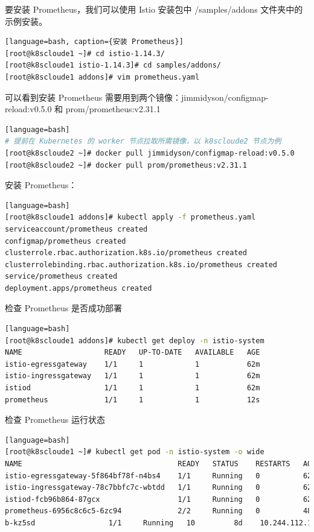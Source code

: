 要安装 Prometheus，我们可以使用 Istio 安装包中 /samples/addons 文件夹中的示例安装。
\begin{lstlisting}[language=bash][language=bash, caption={安装 Prometheus}]
[root@k8scloude1 ~]# cd istio-1.14.3/
[root@k8scloude1 istio-1.14.3]# cd samples/addons/
[root@k8scloude1 addons]# vim prometheus.yaml
\end{lstlisting}
可以看到安装 Prometheus 需要用到两个镜像：jimmidyson/configmap-reload:v0.5.0 和 prom/prometheus:v2.31.1
\begin{lstlisting}[language=bash][language=bash]
# 提前在 Kubernetes 的 worker 节点拉取所需镜像，以 k8scloude2 节点为例
[root@k8scloude2 ~]# docker pull jimmidyson/configmap-reload:v0.5.0
[root@k8scloude2 ~]# docker pull prom/prometheus:v2.31.1
\end{lstlisting}
安装 Prometheus：
\begin{lstlisting}[language=bash][language=bash]
[root@k8scloude1 addons]# kubectl apply -f prometheus.yaml
serviceaccount/prometheus created
configmap/prometheus created
clusterrole.rbac.authorization.k8s.io/prometheus created
clusterrolebinding.rbac.authorization.k8s.io/prometheus created
service/prometheus created
deployment.apps/prometheus created
\end{lstlisting}
检查 Prometheus 是否成功部署
\begin{lstlisting}[language=bash][language=bash]	
[root@k8scloude1 addons]# kubectl get deploy -n istio-system
NAME                   READY   UP-TO-DATE   AVAILABLE   AGE
istio-egressgateway    1/1     1            1           62m
istio-ingressgateway   1/1     1            1           62m
istiod                 1/1     1            1           62m
prometheus             1/1     1            1           12s
\end{lstlisting}
检查 Prometheus 运行状态
\begin{lstlisting}[language=bash][language=bash]	
[root@k8scloude1 ~]# kubectl get pod -n istio-system -o wide
NAME                                    READY   STATUS    RESTARTS   AGE   IP            NODE    NOMINATED NODE   READINESS GATES
istio-egressgateway-5f864bf78f-n4bs4    1/1     Running   0          62m   10.244.2.14   node2   <none>           <none>
istio-ingressgateway-78c7bbfc7c-wbtdd   1/1     Running   0          62m   10.244.2.15   node2   <none>           <none>
istiod-fcb96b864-87gcx                  1/1     Running   0          62m   10.244.1.11   node1   <none>           <none>
prometheus-6956c8c6c5-6zc94             2/2     Running   0          48s   10.244.1.12   node1   <none>           <none>
b-kz5sd                 1/1     Running   10         8d    10.244.112.137   k8scloude2
\end{lstlisting}
